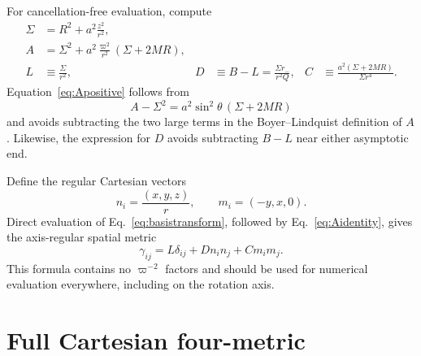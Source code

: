 \documentclass[11pt]{article}
\newcommand{\RBL}{R}
\newcommand{\vpi}{\varpi}
\begin{document}
For cancellation-free evaluation, compute
\begin{align}
 \Sigma&=\RBL^2+a^2\frac{z^2}{r^2}, \label{eq:SigmaCartesian}\\
 A&=\Sigma^2+a^2\frac{\vpi^2}{r^2}(\Sigma+2M\RBL), \label{eq:Apositive}\\
 L&\equiv\frac{\Sigma}{r^2},
 &D&\equiv B-L=\frac{\Sigma r_-}{r^2Q},
 &C&\equiv\frac{a^2(\Sigma+2M\RBL)}{\Sigma r^4}. \label{eq:LDC}
\end{align}
Equation~\eqref{eq:Apositive} follows from
\begin{equation}
 A-\Sigma^2=a^2\sin^2\theta\,(\Sigma+2M\RBL) \label{eq:Aidentity}
\end{equation}
and avoids subtracting the two large terms in the Boyer--Lindquist definition of $A$. Likewise, the expression for $D$ avoids subtracting $B-L$ near either asymptotic end.

Define the regular Cartesian vectors
\begin{equation}
 n_i=\frac{(x,y,z)}{r},\qquad m_i=(-y,x,0). \label{eq:nm}
\end{equation}
Direct evaluation of Eq.~\eqref{eq:basistransform}, followed by Eq.~\eqref{eq:Aidentity}, gives the axis-regular spatial metric
\begin{equation}
 \boxed{\gamma_{ij}=L\delta_{ij}+D n_i n_j+C m_i m_j.} \label{eq:regularmetric}
\end{equation}
This formula contains no $\vpi^{-2}$ factors and should be used for numerical evaluation everywhere, including on the rotation axis.

\section{Full Cartesian four-metric}
\end{document}
